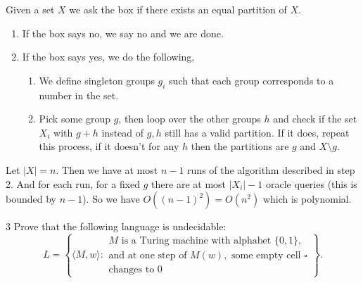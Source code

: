 \documentclass[12pt]{article}
\begin{document}
\begin{solution}
    \bbni
    
    Given a set $X$ we ask the box if there exists an equal partition of $X$.
    \begin{enumerate}
        \item If the box says no, we say no and we are done. 
        \item If the box says yes, we do the following, 
        \begin{enumerate}
            \item We define singleton groups $g_i$ such that each group corresponds to a number in the set. 
            \item Pick some group $g$, then loop over the other groups $h$ and check if the set $X_i$ with $g + h$ instead of $g, h$ still has a valid partition. If it does, repeat this process, if it doesn't for any $h$ then the partitions are $g$ and $X \setminus g$. 
        \end{enumerate}
    \end{enumerate}
    Let $|X| = n$. Then we have at most $n-1$ runs of the algorithm described in step 2. And for each run, for a fixed $g$ there are at most $|X_i| - 1$ oracle queries (this is bounded by $n-1$). So we have $O((n-1)^2) = O(n^2)$ which is polynomial.  
\end{solution}

\newpage

\begin{problem}{3}
    Prove that the following language is undecidable:
    \[
    L=\left\{
    \langle M,w\rangle :
    \begin{array}{l}
    M \text{ is a Turing machine with alphabet } \{0,1\},\\
    \text{and at one step of } M(w), \text{ some empty cell } \square \\
    \text{changes to } 0
    \end{array}
    \right\}.
    \]
\end{problem}
\end{document}
